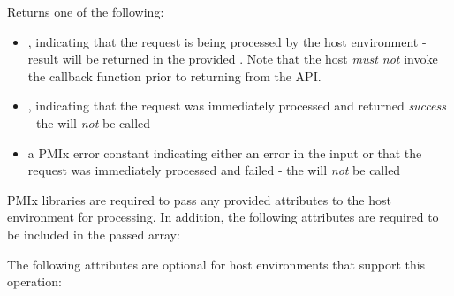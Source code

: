 \begin{arglist}
\end{arglist}

Returns one of the following:

\begin{itemize}
    \item {}, indicating that the request is being processed by the host environment - result will be returned in the provided . Note that the host \emph{must not} invoke the callback function prior to returning from the \ac{API}.
    \item {}, indicating that the request was immediately processed and returned \textit{success} - the  will \textit{not} be called
    \item a PMIx error constant indicating either an error in the input or that the request was immediately processed and failed - the  will \textit{not} be called
\end{itemize}

\reqattrstart
\ac{PMIx} libraries are required to pass any provided attributes to the host environment for processing. In addition, the following attributes are required to be included in the passed  array:


\reqattrend


\optattrstart
The following attributes are optional for host environments that support this operation:


